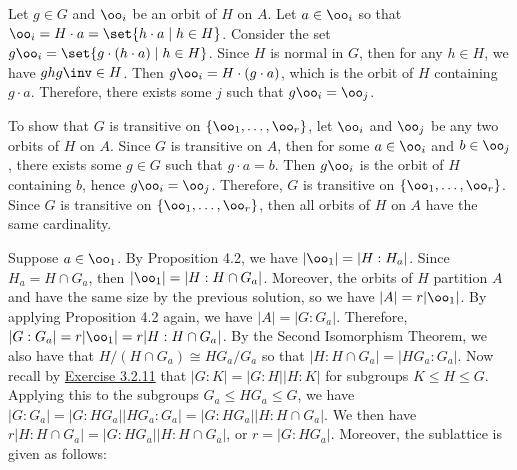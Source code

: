 \begin{solalph}
	\item Let $g \in G$ and $\oo_i$ be an orbit of $H$ on $A$. Let $a \in \oo_i$ so that $\oo_i = H \cdot a = \set{h \cdot a \mid h \in H}$. Consider the set $g\oo_i = \set{g \cdot (h \cdot a) \mid h \in H}$. Since $H$ is normal in $G$, then for any $h \in H$, we have $ghg\inv \in H$. Then $g\oo_i = H \cdot (g \cdot a)$, which is the orbit of $H$ containing $g \cdot a$. Therefore, there exists some $j$ such that $g\oo_i = \oo_j$.
	
	To show that $G$ is transitive on $\{\oo_1, \ldots, \oo_r\}$, let $\oo_i$ and $\oo_j$ be any two orbits of $H$ on $A$. Since $G$ is transitive on $A$, then for some $a \in \oo_i$ and $b \in \oo_j$, there exists some $g \in G$ such that $g \cdot a = b$. Then $g\oo_i$ is the orbit of $H$ containing $b$, hence $g\oo_i = \oo_j$. Therefore, $G$ is transitive on $\{\oo_1, \ldots, \oo_r\}$. Since $G$ is transitive on $\{\oo_1, \ldots, \oo_r\}$, then all orbits of $H$ on $A$ have the same cardinality.
	\item Suppose $a \in \oo_1$. By Proposition 4.2, we have $|\oo_1| = |H : H_a|$. Since $H_a = H \cap G_a$, then $|\oo_1| = |H : H \cap G_a|$. Moreover, the orbits of $H$ partition $A$ and have the same size by the previous solution, so we have $|A| = r|\oo_1|$. By applying Proposition 4.2 again, we have $|A| = |G : G_a|$. Therefore, $|G : G_a| = r|\oo_1| = r|H : H \cap G_a|$. By the Second Isomorphism Theorem, we also have that $H/(H \cap G_a) \cong HG_a/G_a$ so that $|H : H \cap G_a| = |HG_a : G_a|$. Now recall by \hyperref[ex3.2.11]{Exercise 3.2.11} that $|G : K| = |G : H||H : K|$ for subgroups $K \leq H \leq G$. Applying this to the subgroups $G_a \leq HG_a \leq G$, we have $|G : G_a| = |G : HG_a||HG_a : G_a| = |G : HG_a||H : H \cap G_a|.$ We then have $r|H : H \cap G_a| = |G : HG_a||H : H \cap G_a|$, or $r = |G : HG_a|$. Moreover, the sublattice is given as follows:
	\begin{center}
	\end{center}
\end{solalph}

